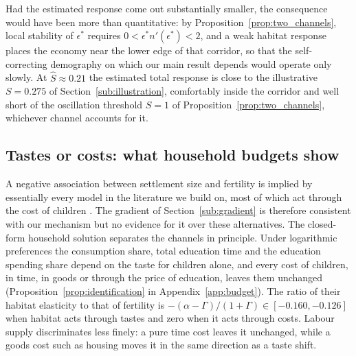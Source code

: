 \documentclass[11pt]{article}
\begin{document}
Had the estimated response come out substantially smaller, the consequence would have been more than
quantitative: by Proposition~\ref{prop:two_channels}, local stability of $\epsilon^{\ast}$ requires
$0<\epsilon^{\ast}n'(\epsilon^{\ast})<2$, and a weak habitat response places the economy near the
lower edge of that corridor, so that the self-correcting demography on which our main result depends
would operate only slowly. At $\hat S\approx0.21$ the estimated total response is close to the
illustrative $S=0.275$ of Section~\ref{sub:illustration}, comfortably inside the corridor and well short of the oscillation threshold $S=1$ of
Proposition~\ref{prop:two_channels}, whichever channel accounts for it.

\subsection{Tastes or costs: what household budgets show}
\label{sub:budget}

A negative association between settlement size and fertility is implied by essentially every model in
the literature we build on, most of which act through the cost of children \citep{DAO2013442,dao25}. The
gradient of Section~\ref{sub:gradient} is therefore consistent with our mechanism but no evidence for it
over these alternatives. The closed-form household solution separates the channels in principle. Under
logarithmic preferences the consumption share, total education time and the education spending share
depend on the taste for children alone, and every cost of children, in time, in goods or through the
price of education, leaves them unchanged (Proposition~\ref{prop:identification} in
Appendix~\ref{app:budget}). The ratio of their habitat elasticity to that of fertility is
$-(\alpha-\Gamma)/(1+\Gamma)\in[-0.160,-0.126]$ when habitat acts through tastes and zero when it acts
through costs. Labour supply discriminates less finely: a pure time cost leaves it unchanged, while a
goods cost such as housing moves it in the same direction as a taste shift.
\end{document}
